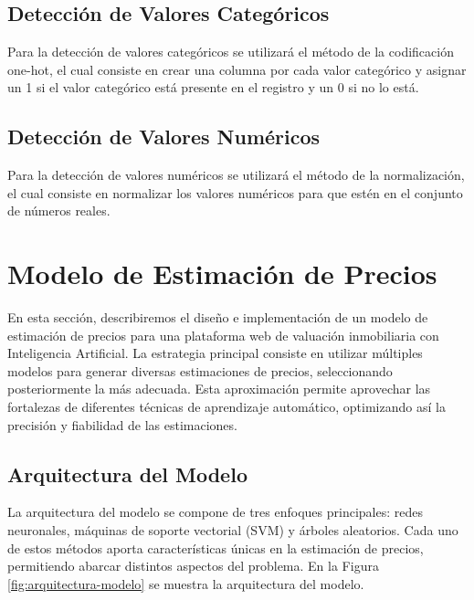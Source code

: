 \subsection{Detección de Valores Categóricos}

Para la detección de valores categóricos se utilizará el método de la
codificación one-hot, el cual consiste en crear una columna por cada valor
categórico y asignar un 1 si el valor categórico está presente en el registro
y un 0 si no lo está.

\subsection{Detección de Valores Numéricos}

Para la detección de valores numéricos se utilizará el método de la
normalización, el cual consiste en normalizar los valores numéricos para que
estén en el conjunto de números reales.


\section{Modelo de Estimación de Precios}

En esta sección, describiremos el diseño e implementación de un modelo de
estimación de precios para una plataforma web de valuación inmobiliaria con
Inteligencia Artificial. La estrategia principal consiste en utilizar múltiples
modelos para generar diversas estimaciones de precios, seleccionando posteriormente
la más adecuada. Esta aproximación permite aprovechar las fortalezas de diferentes
técnicas de aprendizaje automático, optimizando así la precisión y fiabilidad de
las estimaciones.

\subsection{Arquitectura del Modelo}

La arquitectura del modelo se compone de tres enfoques principales: redes neuronales,
máquinas de soporte vectorial (SVM) y árboles aleatorios. Cada uno de estos métodos
aporta características únicas en la estimación de precios, permitiendo abarcar
distintos aspectos del problema. En la Figura \ref{fig:arquitectura-modelo} se
muestra la arquitectura del modelo.

